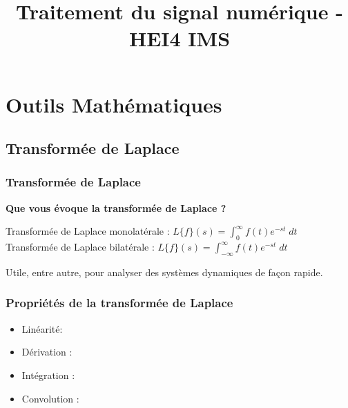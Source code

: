 \documentclass{beamer}
\title[Traitement du signal numérique]{Traitement du signal numérique - HEI4 IMS}
\author[Antony Bazir]{}
\begin{document}
\section{Outils Mathématiques}
\subsection{Transformée de Laplace}

\begin{frame}
\frametitle{Transformée de Laplace}
\textbf{Que vous évoque la transformée de Laplace ?}\\

\vspace{1cm}

{
	Transformée de Laplace monolatérale : $L\{f\}(s) = \displaystyle \int^{\infty}_{0} f(t) e^{-st} \; dt$\\ 
	\vspace{0.3cm}
	Transformée de Laplace bilatérale : $L\{f\}(s) = \displaystyle \int^{\infty}_{-\infty} f(t) e^{-st} \; dt$
}

{
\begin{block}{}
Utile, entre autre, pour analyser des systèmes dynamiques de façon rapide.
\end{block}
}

\end{frame}

\begin{frame}
\frametitle{Propriétés de la transformée de Laplace}
\begin{itemize}
\item<2-> Linéarité: 
\vspace{0.2cm}
\item<4-> Dérivation : 
\vspace{0.2cm}
\item<5-> Intégration : 
\vspace{0.2cm}
\item<7-> Convolution : 
\end{itemize}

\end{frame}
\end{document}

